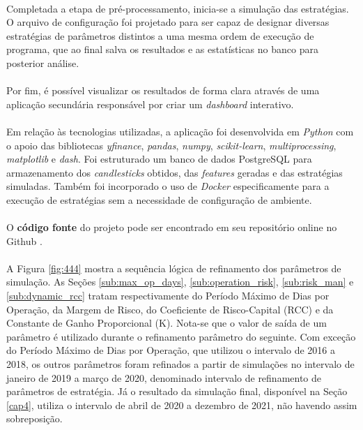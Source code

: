 \paragraph{} Completada a etapa de pré-processamento, inicia-se a simulação das estratégias. O arquivo de configuração foi projetado para ser capaz de designar diversas estratégias de parâmetros distintos a uma mesma ordem de execução de programa, que ao final salva os resultados e as estatísticas no banco para posterior análise.

\paragraph{} Por fim, é possível visualizar os resultados de forma clara através de uma aplicação secundária responsável por criar um \textit{dashboard} interativo.

\paragraph{} Em relação às tecnologias utilizadas, a aplicação foi desenvolvida em \textit{Python} com o apoio das bibliotecas \textit{yfinance}, \textit{pandas}, \textit{numpy}, \textit{scikit-learn}, \textit{multiprocessing}, \textit{matplotlib} e \textit{dash}. Foi estruturado um banco de dados PostgreSQL \cite{postgresql} para armazenamento dos \textit{candlesticks} obtidos, das \textit{features} geradas e das estratégias simuladas. Também foi incorporado o uso de \textit{Docker} especificamente para a execução de estratégias sem a necessidade de configuração de ambiente.

\paragraph{} O \textbf{código fonte} do projeto pode ser encontrado em seu repositório online no Github \cite{project_github}.

\paragraph{} A Figura \ref{fig:444} mostra a sequência lógica de refinamento dos parâmetros de simulação. As Seções \ref{sub:max_op_days}, \ref{sub:operation_risk}, \ref{sub:risk_man} e \ref{sub:dynamic_rcc} tratam respectivamente do Período Máximo de Dias por Operação, da Margem de Risco, do Coeficiente de Risco-Capital (RCC) e da Constante de Ganho Proporcional (K). Nota-se que o valor de saída de um parâmetro é utilizado durante o refinamento parâmetro do seguinte. Com exceção do Período Máximo de Dias por Operação, que utilizou o intervalo de 2016 a 2018, os outros parâmetros foram refinados a partir de simulações no intervalo de janeiro de 2019 a março de 2020, denominado intervalo de refinamento de parâmetros de estratégia. Já o resultado da simulação final, disponível na Seção \ref{cap4}, utiliza o intervalo de abril de 2020 a dezembro de 2021, não havendo assim sobreposição.

